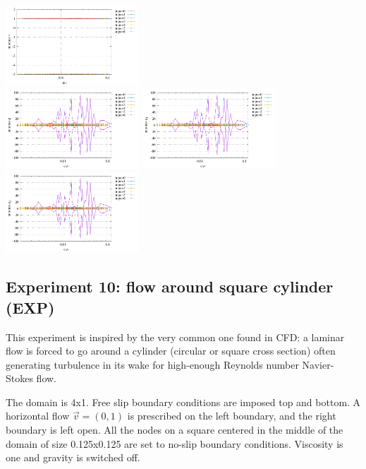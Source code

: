 \begin{center}
\includegraphics[width=5cm]{python_codes/fieldstone_78/results/stats_v_exp9.pdf}\\
\includegraphics[width=5cm]{python_codes/fieldstone_78/results/stats_p_exp9.pdf}
\includegraphics[width=5cm]{python_codes/fieldstone_78/results/stats_q1_exp9.pdf}
\includegraphics[width=5cm]{python_codes/fieldstone_78/results/stats_q2_exp9.pdf}
\end{center}





\newpage
\subsection*{Experiment 10: flow around square cylinder (EXP)}

This experiment is inspired by the very common one found in CFD: a laminar flow 
is forced to go around a cylinder (circular or square cross section) often 
generating turbulence in its wake for high-enough Reynolds number Navier-Stokes flow.

The domain is 4x1. Free slip boundary conditions are imposed top and bottom. 
A horizontal flow $\vec{v}=(0,1)$ is prescribed on the left boundary, and the 
right boundary is left open. All the nodes on a square centered in the middle of the domain 
of size 0.125x0.125 are set to no-slip boundary conditions.
Viscosity is one and gravity is switched off.

